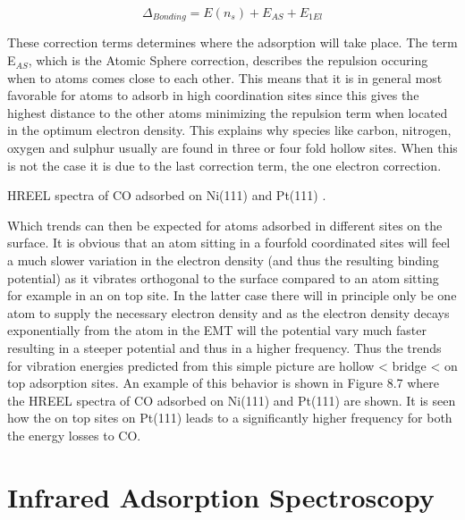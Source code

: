 \begin{equation}
\Delta_{Bonding}=E(n_s) + E_{AS} + E_{1El}
\end{equation}

These correction terms determines where the adsorption will take place. The term E$_{AS}$, which is the Atomic Sphere correction, describes the repulsion occuring when to atoms comes close to each other. This means that it is in general most favorable for atoms to adsorb in high coordination sites since this gives the highest distance to the other atoms  minimizing the repulsion term when located in the optimum electron density. This explains why species like carbon, nitrogen, oxygen and sulphur usually are found in three or four fold hollow sites. When this is not the case it is due to the last  correction term, the one electron correction. 

\vspace*{13cm}

 HREEL spectra of CO adsorbed on Ni(111) and Pt(111) \cite{Ibach}.

\vspace{1cm}
 

 Which trends can then be expected for atoms adsorbed in different sites on the surface. It is obvious that an atom sitting in a fourfold coordinated sites will feel a much slower variation in the electron density (and thus the resulting binding potential) as it vibrates orthogonal to the surface compared to an atom sitting for example in an  on top site. In the  latter case there will in principle  only be  one atom to supply the necessary electron density and as the electron density decays exponentially from the atom in the EMT will the potential vary much faster resulting in a steeper potential and thus in a higher frequency.  Thus the trends for vibration energies  predicted from this simple picture are hollow < bridge < on top adsorption sites.
An example of this behavior is shown in Figure 8.7 where the HREEL spectra of CO adsorbed on Ni(111) and Pt(111) are shown.  It is seen how the on top sites on Pt(111) leads to a significantly higher frequency for both the energy losses to CO.





\section{Infrared Adsorption Spectroscopy}

